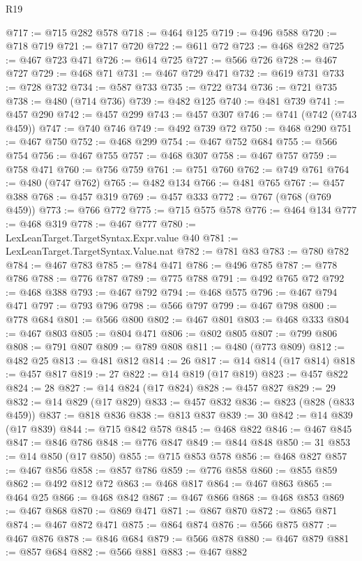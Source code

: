 \begin{lexlean}{R19}
\begin{coremodule}
@717 := @715 @282 @578
@718 := @464 @125
@719 := @496 @588
@720 := @718 @719
@721 := @717 @720
@722 := @611 @72
@723 := @468 @282
@725 := @467 @723 @471
@726 := @614 @725
@727 := @566 @726
@728 := @467 @727
@729 := @468 @71
@731 := @467 @729 @471
@732 := @619 @731
@733 := @728 @732
@734 := @587 @733
@735 := @722 @734
@736 := @721 @735
@738 := @480 (@714 @736)
@739 := @482 @125
@740 := @481 @739
@741 := @457 @290
@742 := @457 @299
@743 := @457 @307
@746 := @741 (@742 (@743 @459))
@747 := @740 @746
@749 := @492 @739 @72
@750 := @468 @290
@751 := @467 @750
@752 := @468 @299
@754 := @467 @752 @684
@755 := @566 @754
@756 := @467 @755
@757 := @468 @307
@758 := @467 @757
@759 := @758 @471
@760 := @756 @759
@761 := @751 @760
@762 := @749 @761
@764 := @480 (@747 @762)
@765 := @482 @134
@766 := @481 @765
@767 := @457 @388
@768 := @457 @319
@769 := @457 @333
@772 := @767 (@768 (@769 @459))
@773 := @766 @772
@775 := @715 @575 @578
@776 := @464 @134
@777 := @468 @319
@778 := @467 @777
@780 := LexLeanTarget.TargetSyntax.Expr.value @40
@781 := LexLeanTarget.TargetSyntax.Value.nat
@782 := @781 @83
@783 := @780 @782
@784 := @467 @783
@785 := @784 @471
@786 := @496 @785
@787 := @778 @786
@788 := @776 @787
@789 := @775 @788
@791 := @492 @765 @72
@792 := @468 @388
@793 := @467 @792
@794 := @468 @575
@796 := @467 @794 @471
@797 := @793 @796
@798 := @566 @797
@799 := @467 @798
@800 := @778 @684
@801 := @566 @800
@802 := @467 @801
@803 := @468 @333
@804 := @467 @803
@805 := @804 @471
@806 := @802 @805
@807 := @799 @806
@808 := @791 @807
@809 := @789 @808
@811 := @480 (@773 @809)
@812 := @482 @25
@813 := @481 @812
@814 := 26
@817 := @14 @814 (@17 @814)
@818 := @457 @817
@819 := 27
@822 := @14 @819 (@17 @819)
@823 := @457 @822
@824 := 28
@827 := @14 @824 (@17 @824)
@828 := @457 @827
@829 := 29
@832 := @14 @829 (@17 @829)
@833 := @457 @832
@836 := @823 (@828 (@833 @459))
@837 := @818 @836
@838 := @813 @837
@839 := 30
@842 := @14 @839 (@17 @839)
@844 := @715 @842 @578
@845 := @468 @822
@846 := @467 @845
@847 := @846 @786
@848 := @776 @847
@849 := @844 @848
@850 := 31
@853 := @14 @850 (@17 @850)
@855 := @715 @853 @578
@856 := @468 @827
@857 := @467 @856
@858 := @857 @786
@859 := @776 @858
@860 := @855 @859
@862 := @492 @812 @72
@863 := @468 @817
@864 := @467 @863
@865 := @464 @25
@866 := @468 @842
@867 := @467 @866
@868 := @468 @853
@869 := @467 @868
@870 := @869 @471
@871 := @867 @870
@872 := @865 @871
@874 := @467 @872 @471
@875 := @864 @874
@876 := @566 @875
@877 := @467 @876
@878 := @846 @684
@879 := @566 @878
@880 := @467 @879
@881 := @857 @684
@882 := @566 @881
@883 := @467 @882

\end{coremodule}
\end{lexlean}
